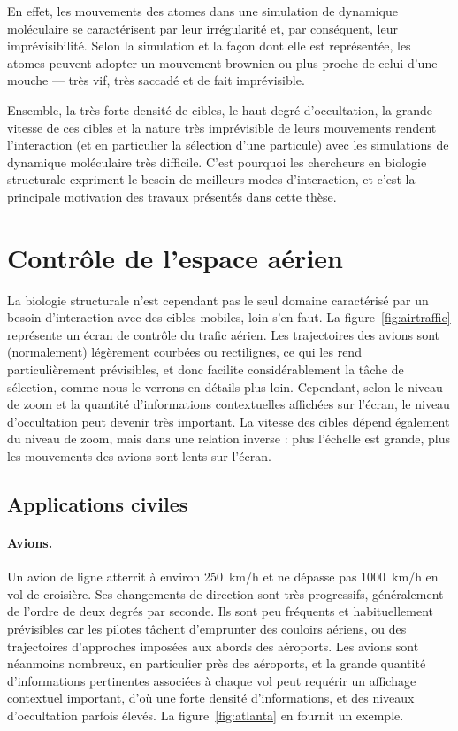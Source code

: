 	En effet, les mouvements des atomes dans une simulation de dynamique moléculaire se caractérisent par leur irrégularité et, par conséquent, leur imprévisibilité. Selon la simulation et la façon dont elle est représentée, les atomes peuvent adopter un mouvement brownien ou plus proche de celui d'une mouche --- très vif, très saccadé et de fait imprévisible.
	
	Ensemble, la très forte densité de cibles, le haut degré d'occultation, la grande vitesse de ces cibles et la nature très imprévisible de leurs mouvements rendent l'interaction (et en particulier la sélection d'une particule) avec les simulations de dynamique moléculaire très difficile. C'est pourquoi les chercheurs en biologie structurale expriment le besoin de meilleurs modes d'interaction, et c'est la principale motivation des travaux présentés dans cette thèse.
	
	
	\section{Contrôle de l'espace aérien}
	La biologie structurale n'est cependant pas le seul domaine caractérisé par un besoin d'interaction avec des cibles mobiles, loin s'en faut. La figure~\ref{fig:airtraffic} représente un écran de contrôle du trafic aérien. Les trajectoires des avions sont (normalement) légèrement courbées ou rectilignes, ce qui les rend particulièrement prévisibles, et donc facilite considérablement la tâche de sélection, comme nous le verrons en détails plus loin. Cependant, selon le niveau de zoom et la quantité d'informations contextuelles affichées sur l'écran, le niveau d'occultation peut devenir très important. La vitesse des cibles dépend également du niveau de zoom, mais dans une relation inverse : plus l'échelle est grande, plus les mouvements des avions sont lents sur l'écran.
	
	\subsection{Applications civiles}
	\paragraph{Avions.}
	Un avion de ligne atterrit à environ 250~km/h et ne dépasse pas 1000~km/h en vol de croisière. Ses changements de direction sont très progressifs, généralement de l'ordre de deux degrés par seconde. Ils sont peu fréquents et habituellement prévisibles car les pilotes tâchent d'emprunter des couloirs aériens, ou des trajectoires d'approches imposées aux abords des aéroports. Les avions sont néanmoins nombreux, en particulier près des aéroports, et la grande quantité d'informations pertinentes associées à chaque vol peut requérir un affichage contextuel important, d'où une forte densité d'informations, et des niveaux d'occultation parfois élevés. La figure~\ref{fig:atlanta} en fournit un exemple.
	
